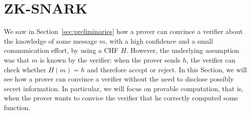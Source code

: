 \section{ZK-SNARK}\label{sec:zksnark}
We saw in Section~\ref{sec:preliminaries} how a prover can convince a verifier about the knowledge of
some message \(m\), with a high confidence and a small communication effort, by using a CHF \(H\).
However, the underlying assumption was that \(m\) is known by the verifier: when the prover sends
\(h\), the verifier can check whether \(H\left(m\right) = h\) and therefore accept or reject.
In this Section, we will see how a prover can convince a verifier without the need to disclose
possibly secret information.
In particular, we will focus on provable computation, that is, when the prover wants to convice
the verifier that he correctly computed some function.




